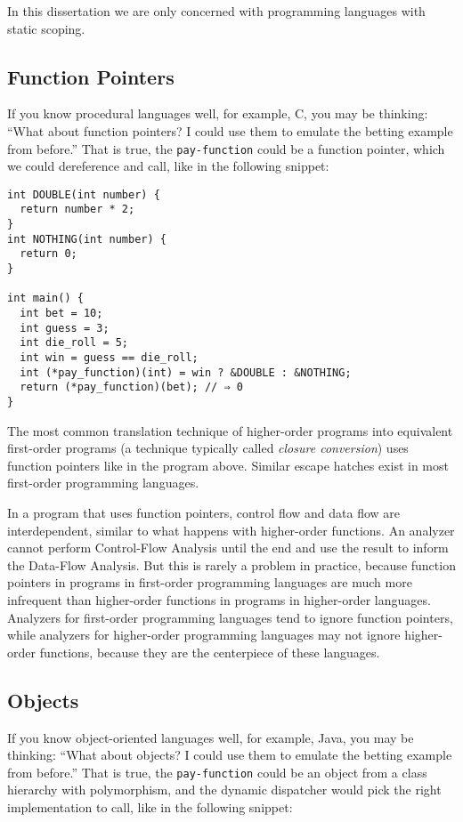 \documentclass[12pt, oneside]{book}
\begin{document}
In this dissertation we are only concerned with programming languages with static scoping.

\subsection{Function Pointers}

If you know procedural languages well, for example, C, you may be thinking: “What about function pointers? I could use them to emulate the betting example from before.” That is true, the \texttt{pay-function} could be a function pointer, which we could dereference and call, like in the following snippet:

\begin{Verbatim}
int DOUBLE(int number) {
  return number * 2;
}
int NOTHING(int number) {
  return 0;
}

int main() {
  int bet = 10;
  int guess = 3;
  int die_roll = 5;
  int win = guess == die_roll;
  int (*pay_function)(int) = win ? &DOUBLE : &NOTHING;
  return (*pay_function)(bet); // ⇒ 0
}
\end{Verbatim}

The most common translation technique of higher-order programs into equivalent first-order programs (a technique typically called \emph{closure conversion}) uses function pointers like in the program above. Similar escape hatches exist in most first-order programming languages.

In a program that uses function pointers, control flow and data flow are interdependent, similar to what happens with higher-order functions. An analyzer cannot perform Control-Flow Analysis until the end and use the result to inform the Data-Flow Analysis. But this is rarely a problem in practice, because function pointers in programs in first-order programming languages are much more infrequent than higher-order functions in programs in higher-order languages. Analyzers for first-order programming languages tend to ignore function pointers, while analyzers for higher-order programming languages may not ignore higher-order functions, because they are the centerpiece of these languages.

\subsection{Objects}
\label{section:objects}

If you know object-oriented languages well, for example, Java, you may be thinking: “What about objects? I could use them to emulate the betting example from before.” That is true, the \texttt{pay-function} could be an object from a class hierarchy with polymorphism, and the dynamic dispatcher would pick the right implementation to call, like in the following snippet:
\end{document}
